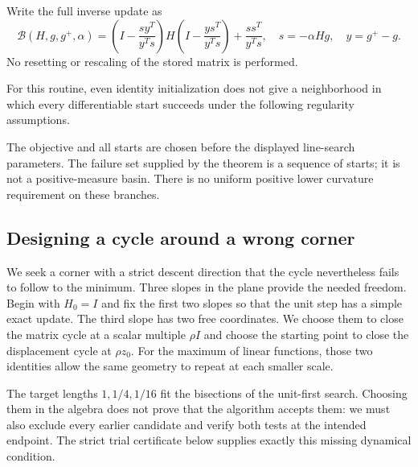 Write the full inverse update as
\begin{equation}\label{art:failure_update}
 \mathcal B(H,g,g^+,\alpha)
 =\left(I-\frac{sy^T}{y^Ts}\right)H
  \left(I-\frac{ys^T}{y^Ts}\right)+\frac{ss^T}{y^Ts},
 \quad s=-\alpha Hg,\quad y=g^+-g.
\end{equation}
No resetting or rescaling of the stored matrix is performed.

For this routine, even identity initialization does not give a neighborhood
in which every differentiable start succeeds under the following regularity
assumptions.


The objective and all starts are chosen before the displayed line-search
parameters. The failure set supplied by the theorem is a sequence of starts;
it is not a positive-measure basin. There is no uniform positive lower
curvature requirement on these branches.

\subsection{Designing a cycle around a wrong corner}
We seek a corner with a strict descent direction that the cycle nevertheless
fails to follow to the minimum. Three slopes in the plane provide the needed
freedom. Begin with $H_0=I$ and fix the first two slopes so that the unit step
has a simple exact update. The third slope has two free coordinates. We choose
them to close the matrix cycle at a scalar multiple $\rho I$ and choose the
starting point to close the displacement cycle at $\rho z_0$. For the maximum
of linear functions, those two identities allow the same geometry to repeat
at each smaller scale.

The target lengths $1,1/4,1/16$ fit the bisections of the unit-first search.
Choosing them in the algebra does not prove that the algorithm accepts them:
we must also exclude every earlier candidate and verify both tests at the
intended endpoint. The strict trial certificate below supplies exactly this
missing dynamical condition.

